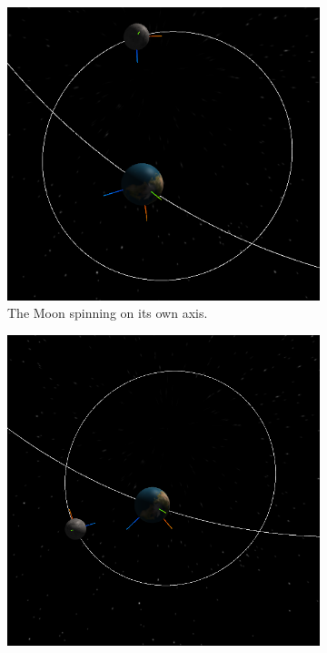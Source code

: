 \documentclass[12pt]{article}
\begin{document}
\begin{figure}[H]
\begin{subfigure}[b]{0.4\textwidth}
                \includegraphics[width=\textwidth]{images/earthandmoonaxisspinabove2}
                \caption{The Moon spinning on its own axis.}
                \label{fig: The axial spin of the Moon.}
       \end{subfigure}
               \begin{subfigure}[b]{0.4\textwidth}
                \includegraphics[width=\textwidth]{images/earthandmoonaxisspinabove3}

\end{subfigure}
\end{figure}
\end{document}
